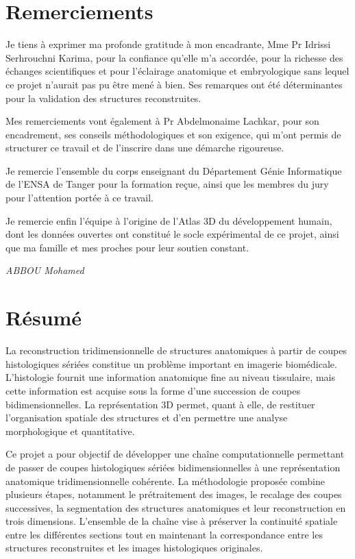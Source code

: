 \documentclass[12pt,a4paper]{report}
\begin{document}

\chapter*{Remerciements}

Je tiens à exprimer ma profonde gratitude à mon encadrante, Mme Pr Idrissi Serhrouchni Karima, pour la confiance qu'elle m'a accordée, pour la richesse des échanges scientifiques et pour l'éclairage anatomique et embryologique sans lequel ce projet n'aurait pas pu être mené à bien. Ses remarques ont été déterminantes pour la validation des structures reconstruites.

Mes remerciements vont également à Pr Abdelmonaime Lachkar, pour son encadrement, ses conseils méthodologiques et son exigence, qui m'ont permis de structurer ce travail et de l'inscrire dans une démarche rigoureuse.

Je remercie l'ensemble du corps enseignant du Département Génie Informatique de l'ENSA de Tanger pour la formation reçue, ainsi que les membres du jury pour l'attention portée à ce travail.

Je remercie enfin l'équipe à l'origine de l'Atlas 3D du développement humain, dont les données ouvertes ont constitué le socle expérimental de ce projet, ainsi que ma famille et mes proches pour leur soutien constant.

\vspace{0.5cm}
\hfill \textit{ABBOU Mohamed}

\chapter*{Résumé}

La reconstruction tridimensionnelle de structures anatomiques à partir de coupes histologiques sériées constitue un problème important en imagerie biomédicale. L'histologie fournit une information anatomique fine au niveau tissulaire, mais cette information est acquise sous la forme d'une succession de coupes bidimensionnelles. La représentation 3D permet, quant à elle, de restituer l'organisation spatiale des structures et d'en permettre une analyse morphologique et quantitative.

Ce projet a pour objectif de développer une chaîne computationnelle permettant de passer de coupes histologiques sériées bidimensionnelles à une représentation anatomique tridimensionnelle cohérente. La méthodologie proposée combine plusieurs étapes, notamment le prétraitement des images, le recalage des coupes successives, la segmentation des structures anatomiques et leur reconstruction en trois dimensions. L'ensemble de la chaîne vise à préserver la continuité spatiale entre les différentes sections tout en maintenant la correspondance entre les structures reconstruites et les images histologiques originales.
\end{document}
